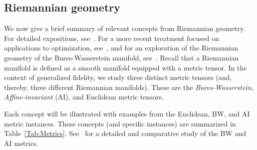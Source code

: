 \documentclass[12pt]{article}
\theoremstyle{definition}
\begin{document}
\subsection{Riemannian geometry}
We now give a brief summary of relevant concepts from Riemannian geometry. For detailed expositions, see~\cite{lee2018introduction, do1992riemannian}. For a more recent treatment focused on applications to optimization, see~\cite{boumal2023introduction}, and for an exploration of the Riemannian geometry of the Bures-Wasserstein manifold, see~\cite{chewi2020gradient}. Recall that a Riemannian manifold is defined as a smooth manifold equipped with a metric tensor. In the context of generalized fidelity, we study three distinct metric tensors (and, thereby, three different Riemannian manifolds). These are the \textit{Bures-Wasserstein}, \textit{Affine-invariant} (AI), and Euclidean metric tensors.

Each concept will be illustrated with examples from the Euclidean, BW, and AI metric instances. These concepts (and specific instances) are summarized in Table~\ref{Tab:Metrics}. See~\cite{Mishra2021Compare} for a detailed and comparative study of the BW and AI metrics. 
\end{document}
